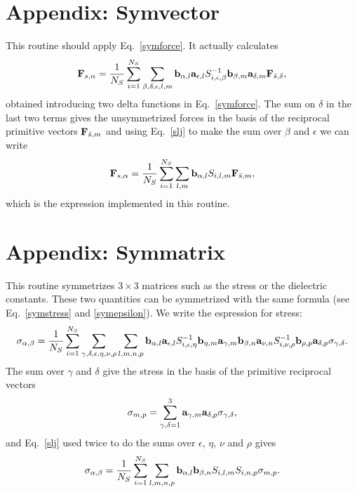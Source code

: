 \documentclass[12pt,a4paper,twoside]{report}
\begin{document}
\section{Appendix: Symvector} 
This routine should apply Eq.~\ref{symforce}. It 
actually calculates 
\begin{equation}
{\bf F}_{s,\alpha} ={1 \over N_S} \sum_{i=1}^{N_S} \sum_{\beta, \delta, \epsilon, l, m} {\bf b}_{\alpha,l} {\bf a}_{\epsilon,l} S^{-1}_{i,\epsilon,\beta} {\bf b}_{\beta,m} {\bf a}_{\delta,m}
{\bf F}_{\bar s,\delta},
\label{symforceapp1}
\end{equation}
obtained introducing two delta functions in Eq.~\ref{symforce}. The sum on $\delta$ in the last two terms gives the unsymmetrized forces in the basis of the
reciprocal primitive vectors ${\bf F}_{{\bar s},m}$ and
using Eq.~\ref{slj} to make the sum over {$\beta$ and $\epsilon$} we can write 
\begin{equation}
{\bf F}_{s,\alpha} ={1 \over N_S} \sum_{i=1}^{N_S} \sum_{l, m} {\bf b}_{\alpha,l} S_{i,l,m}  {\bf F}_{\bar s,m},
\label{symforceapp2}
\end{equation}
which is the expression implemented in this routine.

\section{Appendix: Symmatrix}
This routine symmetrizes $3\times 3$ matrices such as the stress or the dielectric constants. These two quantities can be symmetrized with the same formula
(see Eq.~\ref{symstress} and \ref{symepsilon}).
We write the espression for stress:
\begin{equation}
\sigma_{\alpha,\beta}={1 \over N_S} \sum_{i=1}^{N_S}
\sum_{\gamma, \delta, \epsilon, \eta, \nu, \rho} \sum_{l, m, n, p} {\bf b}_{\alpha,l} {\bf a}_{\epsilon,l} S^{-1}_{i,\epsilon,\eta} {\bf b}_{\eta,m} {\bf a}_{\gamma,m} {\bf b}_{\beta,n} {\bf a}_{\nu,n} S^{-1}_{i,\nu,\rho} {\bf b}_{\rho,p} {\bf a}_{\delta,p} \sigma_{\gamma,\delta}.
\end{equation}
The sum over $\gamma$ and $\delta$ give the stress in the basis of the primitive reciprocal vectors
\begin{equation}
\sigma_{m,p}=\sum_{\gamma, \delta=1}^3
{\bf a}_{\gamma,m} {\bf a}_{\delta,p} \sigma_{\gamma,\delta},
\label{smp}
\end{equation}
and Eq.~\ref{slj} used twice to do the sums over $\epsilon$, $\eta$, $\nu$ and $\rho$ gives
\begin{equation}
\sigma_{\alpha,\beta}={1 \over N_S} \sum_{i=1}^{N_S}
 \sum_{l, m, n, p} {\bf b}_{\alpha,l} {\bf b}_{\beta,n}S_{i,l,m} S_{i,n,p} \sigma_{m,p}.
\end{equation}
\end{document}
